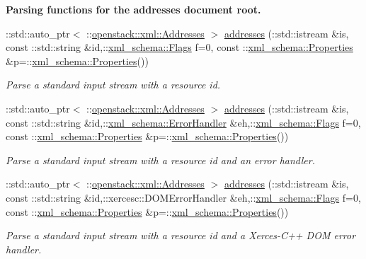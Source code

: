 \begin{Indent}{\bf Parsing functions for the addresses document root.}
\begin{DoxyCompactItemize}
::std::auto\_\-ptr$<$ ::\hyperlink{classopenstack_1_1xml_1_1Addresses}{openstack::xml::Addresses} $>$ \hyperlink{namespaceopenstack_1_1xml_ac1e6774952e715f35775911cbd37ebbb}{addresses} (::std::istream \&is, const ::std::string \&id,::\hyperlink{namespacexml__schema_affb4c227cbd9aa7453dd1dc5a1401943}{xml\_\-schema::Flags} f=0, const ::\hyperlink{namespacexml__schema_ad27ce19a7ee1d3b1064092648898f64c}{xml\_\-schema::Properties} \&p=::\hyperlink{namespacexml__schema_ad27ce19a7ee1d3b1064092648898f64c}{xml\_\-schema::Properties}())
\begin{DoxyCompactList}\small\item\em Parse a standard input stream with a resource id. \item\end{DoxyCompactList}\item 
::std::auto\_\-ptr$<$ ::\hyperlink{classopenstack_1_1xml_1_1Addresses}{openstack::xml::Addresses} $>$ \hyperlink{namespaceopenstack_1_1xml_a24d31f92087eb96bb50e7ded90d0edd9}{addresses} (::std::istream \&is, const ::std::string \&id,::\hyperlink{namespacexml__schema_ab1c9361bfd3b404eaabf0c31eded79dc}{xml\_\-schema::ErrorHandler} \&eh,::\hyperlink{namespacexml__schema_affb4c227cbd9aa7453dd1dc5a1401943}{xml\_\-schema::Flags} f=0, const ::\hyperlink{namespacexml__schema_ad27ce19a7ee1d3b1064092648898f64c}{xml\_\-schema::Properties} \&p=::\hyperlink{namespacexml__schema_ad27ce19a7ee1d3b1064092648898f64c}{xml\_\-schema::Properties}())
\begin{DoxyCompactList}\small\item\em Parse a standard input stream with a resource id and an error handler. \item\end{DoxyCompactList}\item 
::std::auto\_\-ptr$<$ ::\hyperlink{classopenstack_1_1xml_1_1Addresses}{openstack::xml::Addresses} $>$ \hyperlink{namespaceopenstack_1_1xml_ae53132d1c86c7e84e44c28ab8eb95830}{addresses} (::std::istream \&is, const ::std::string \&id,::xercesc::DOMErrorHandler \&eh,::\hyperlink{namespacexml__schema_affb4c227cbd9aa7453dd1dc5a1401943}{xml\_\-schema::Flags} f=0, const ::\hyperlink{namespacexml__schema_ad27ce19a7ee1d3b1064092648898f64c}{xml\_\-schema::Properties} \&p=::\hyperlink{namespacexml__schema_ad27ce19a7ee1d3b1064092648898f64c}{xml\_\-schema::Properties}())
\begin{DoxyCompactList}\small\item\em Parse a standard input stream with a resource id and a Xerces-\/C++ DOM error handler. \item\end{DoxyCompactList}\item 

\end{DoxyCompactItemize}
\end{Indent}
